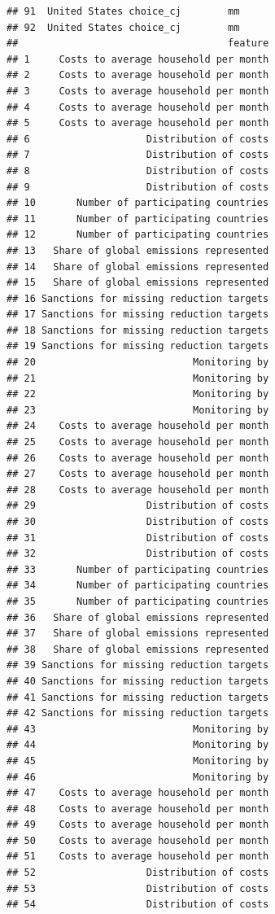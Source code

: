 \documentclass[a4paper,12pt]{article}\usepackage[]{graphicx}\usepackage[]{color}
\makeatletter
\newenvironment{kframe}{%
 \def\at@end@of@kframe{}%
 \ifinner\ifhmode%
  \def\at@end@of@kframe{\end{minipage}}%
  \begin{minipage}{\columnwidth}%
 \fi\fi%
 \def\FrameCommand##1{\hskip\@totalleftmargin \hskip-\fboxsep
 \colorbox{shadecolor}{##1}\hskip-\fboxsep
     \hskip-\linewidth \hskip-\@totalleftmargin \hskip\columnwidth}%
 \MakeFramed {\advance\hsize-\width
   \@totalleftmargin\z@ \linewidth\hsize
   \@setminipage}}%
 {\par\unskip\endMakeFramed%
 \at@end@of@kframe}
\newenvironment{knitrout}{}{} %
\makeatother
\begin{document}
\begin{knitrout}
\begin{kframe}
\begin{verbatim}
## 91  United States choice_cj        mm
## 92  United States choice_cj        mm
##                                    feature
## 1     Costs to average household per month
## 2     Costs to average household per month
## 3     Costs to average household per month
## 4     Costs to average household per month
## 5     Costs to average household per month
## 6                    Distribution of costs
## 7                    Distribution of costs
## 8                    Distribution of costs
## 9                    Distribution of costs
## 10       Number of participating countries
## 11       Number of participating countries
## 12       Number of participating countries
## 13   Share of global emissions represented
## 14   Share of global emissions represented
## 15   Share of global emissions represented
## 16 Sanctions for missing reduction targets
## 17 Sanctions for missing reduction targets
## 18 Sanctions for missing reduction targets
## 19 Sanctions for missing reduction targets
## 20                           Monitoring by
## 21                           Monitoring by
## 22                           Monitoring by
## 23                           Monitoring by
## 24    Costs to average household per month
## 25    Costs to average household per month
## 26    Costs to average household per month
## 27    Costs to average household per month
## 28    Costs to average household per month
## 29                   Distribution of costs
## 30                   Distribution of costs
## 31                   Distribution of costs
## 32                   Distribution of costs
## 33       Number of participating countries
## 34       Number of participating countries
## 35       Number of participating countries
## 36   Share of global emissions represented
## 37   Share of global emissions represented
## 38   Share of global emissions represented
## 39 Sanctions for missing reduction targets
## 40 Sanctions for missing reduction targets
## 41 Sanctions for missing reduction targets
## 42 Sanctions for missing reduction targets
## 43                           Monitoring by
## 44                           Monitoring by
## 45                           Monitoring by
## 46                           Monitoring by
## 47    Costs to average household per month
## 48    Costs to average household per month
## 49    Costs to average household per month
## 50    Costs to average household per month
## 51    Costs to average household per month
## 52                   Distribution of costs
## 53                   Distribution of costs
## 54                   Distribution of costs

\end{verbatim}
\end{kframe}
\end{knitrout}
\end{document}

